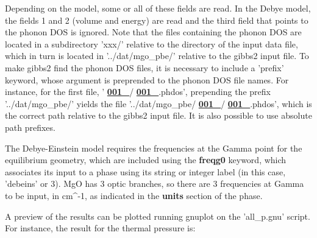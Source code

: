 \documentclass[a4paper]{article}
\begin{document}
Depending on the model, some or all of these fields are read. In the
Debye model, the fields 1 and 2 (volume and energy) are read and the
third field that points to the phonon DOS is ignored. Note that the
files containing the phonon DOS are located in a subdirectory 'xxx/'
relative to the directory of the input data file, which in turn is
located in '../dat/mgo\_pbe/' relative to the gibbs2 input file. To
make gibbs2 find the phonon DOS files, it is necessary to include a
'prefix' keyword, whose argument is preprended to the phonon DOS file
names. For instance, for the first file, '%
\hyperlink{id13}{\textbf{\color{red}001\_}}/%
\hyperlink{id15}{\textbf{\color{red}001\_}}.phdos', prepending
the prefix '../dat/mgo\_pbe/' yields the file
'../dat/mgo\_pbe/%
\hyperlink{id17}{\textbf{\color{red}001\_}}/%
\hyperlink{id19}{\textbf{\color{red}001\_}}.phdos', which is the correct path relative
to the gibbs2 input file. It is also possible to use absolute path
prefixes.

The Debye-Einstein model requires the frequencies at the Gamma point
for the equilibrium geometry, which are included using the \textbf{freqg0}
keyword, which associates its input to a phase using its string or
integer label (in this case, 'debeins' or 3). MgO has 3 optic
branches, so there are 3 frequencies at Gamma to be input, in cm\textasciicircum{}-1,
as indicated in the \textbf{units} section of the phase.

A preview of the results can be plotted running gnuplot on the
'all\_p.gnu' script. For instance, the result for the thermal pressure
is:

\noindent{}
\end{document}
